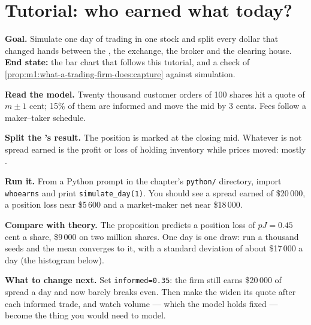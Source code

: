 \section{Tutorial: who earned what today?}\label{tut:m1:what-a-trading-firm-does:whoearns}

\begin{tutorial}
\textbf{Goal.} Simulate one day of trading in one stock and split every
dollar that changed hands between the , the exchange, the broker
and the clearing house. \textbf{End state:} the bar chart that follows this tutorial,
and a check of
\cref{prop:m1:what-a-trading-firm-does:capture} against simulation.
\begin{tutsteps}
\item \textbf{Read the model.} Twenty thousand customer orders of 100 shares
hit a quote of $m \pm 1$ cent; 15\% of them are informed and move the mid by
3 cents. Fees follow a maker--taker schedule.
\label{lst:m1:what-a-trading-firm-does:loop}
\item \textbf{Split the 's result.} The position is marked at
the closing mid. Whatever is not spread earned is the profit or loss of
holding inventory while prices moved: mostly .
\label{lst:m1:what-a-trading-firm-does:split}
\item \textbf{Run it.} From a Python prompt in the chapter's
\texttt{python/} directory, import \texttt{whoearns} and print
\texttt{simulate\_day(1)}. You should see a spread earned of \$20\,000, a position loss near \$5\,600
and a market-maker net near \$18\,000.
\item \textbf{Compare with theory.} The proposition predicts a position loss
of $pJ = 0.45$ cent a share, \$9\,000 on two million shares. One day is one
draw: run a thousand seeds and the mean converges to it, with a standard
deviation of about \$17\,000 a day (the histogram below).
\end{tutsteps}
\textbf{What to change next.} Set \texttt{informed=0.35}: the firm still
earns \$20\,000 of spread a day and now barely breaks even. Then make the
 widen its quote after each informed trade, and watch volume ---
which the model holds fixed --- become the thing you would need to model.
\end{tutorial}

